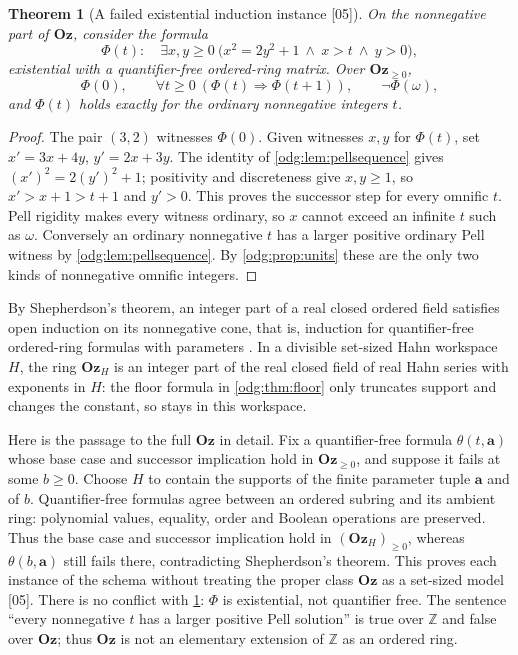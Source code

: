 \documentclass[11pt,oneside]{article}
\numberwithin{equation}{section}
\newtheorem{theorem}{Theorem}[section]
\theoremstyle{definition}
\theoremstyle{remark}
\newcommand{\Oz}{\mathbf{Oz}}
\newcommand{\Z}{\mathbb Z}
\newcommand{\src}[1]{\textup{\textsf{\small[#1]}}}
\begin{document}
\begin{theorem}[A failed existential induction instance \src{05}]\label{odg:thm:induction}
On the nonnegative part of $\Oz$, consider the formula
\begin{equation}\label{odg:eq:phi}
 \Phi(t):\quad
 \exists x,y\ge0\ \bigl(x^2=2y^2+1\ \wedge\ x>t\ \wedge\ y>0\bigr),
\end{equation}
existential with a quantifier-free ordered-ring matrix. Over $\Oz_{\ge0}$,
\[
 \Phi(0),\qquad
 \forall t\ge0\ (\Phi(t)\Rightarrow\Phi(t+1)),
 \qquad \neg\Phi(\omega),
\]
and $\Phi(t)$ holds exactly for the ordinary nonnegative integers $t$.
\end{theorem}
\begin{proof}
The pair $(3,2)$ witnesses $\Phi(0)$. Given witnesses $x,y$ for $\Phi(t)$,
set $x'=3x+4y$, $y'=2x+3y$. The identity of \cref{odg:lem:pellsequence}
gives $(x')^2=2(y')^2+1$; positivity and discreteness give $x,y\ge1$, so
$x'>x+1>t+1$ and $y'>0$. This proves the successor step for every omnific
$t$. Pell rigidity makes every witness ordinary, so $x$ cannot exceed an
infinite $t$ such as $\omega$. Conversely an ordinary nonnegative $t$ has a
larger positive ordinary Pell witness by \cref{odg:lem:pellsequence}. By
\cref{odg:prop:units} these are the only two kinds of nonnegative omnific
integers.
\end{proof}

By Shepherdson's theorem, an integer part of a real closed ordered field
satisfies open induction on its nonnegative cone, that is, induction for
quantifier-free ordered-ring formulas with parameters
\cite{Shepherdson,Glivicky}. In a divisible set-sized Hahn workspace $H$, the ring
$\Oz_H$ is an integer part of the real closed field of real Hahn series with
exponents in $H$: the floor formula in \cref{odg:thm:floor} only truncates
support and changes the constant, so stays in this workspace.

Here is the passage to the full $\Oz$ in detail. Fix a quantifier-free
formula $\theta(t,\mathbf a)$ whose base case and successor implication hold
in $\Oz_{\ge0}$, and suppose it fails at some $b\ge0$. Choose $H$ to contain
the supports of the finite parameter tuple $\mathbf a$ and of $b$.
Quantifier-free formulas agree between an ordered subring and its ambient
ring: polynomial values, equality, order and Boolean operations are
preserved. Thus the base case and successor implication hold in
$(\Oz_H)_{\ge0}$, whereas $\theta(b,\mathbf a)$ still fails there,
contradicting Shepherdson's theorem. This proves each instance of the schema
without treating the proper class $\Oz$ as a set-sized model \src{05}.
There is no conflict with
\cref{odg:thm:induction}: $\Phi$ is existential, not quantifier free. The
sentence ``every nonnegative $t$ has a larger positive Pell solution'' is
true over $\Z$ and false over $\Oz$; thus $\Oz$ is not an elementary extension
of $\Z$ as an ordered ring.
\end{document}
